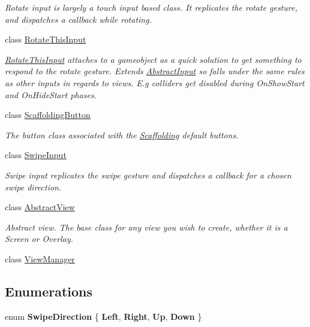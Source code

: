 \begin{DoxyCompactItemize}
\begin{DoxyCompactList}\small\item\em Rotate input is largely a touch input based class. It replicates the rotate gesture, and dispatches a callback while rotating. \end{DoxyCompactList}\item 
class \hyperlink{class_scaffolding_1_1_rotate_this_input}{Rotate\-This\-Input}
\begin{DoxyCompactList}\small\item\em \hyperlink{class_scaffolding_1_1_rotate_this_input}{Rotate\-This\-Input} attaches to a gameobject as a quick solution to get something to respond to the rotate gesture. Extends \hyperlink{class_scaffolding_1_1_abstract_input}{Abstract\-Input} so falls under the same rules as other inputs in regards to views. E.\-g colliders get disabled during On\-Show\-Start and On\-Hide\-Start phases. \end{DoxyCompactList}\item 
class \hyperlink{class_scaffolding_1_1_scaffolding_button}{Scaffolding\-Button}
\begin{DoxyCompactList}\small\item\em The button class associated with the \hyperlink{namespace_scaffolding}{Scaffolding} default buttons. \end{DoxyCompactList}\item 
class \hyperlink{class_scaffolding_1_1_swipe_input}{Swipe\-Input}
\begin{DoxyCompactList}\small\item\em Swipe input replicates the swipe gesture and dispatches a callback for a chosen swipe direction. \end{DoxyCompactList}\item 
class \hyperlink{class_scaffolding_1_1_abstract_view}{Abstract\-View}
\begin{DoxyCompactList}\small\item\em Abstract view. The base class for any view you wish to create, whether it is a Screen or Overlay. \end{DoxyCompactList}\item 
class \hyperlink{class_scaffolding_1_1_view_manager}{View\-Manager}
\end{DoxyCompactItemize}
\subsection*{Enumerations}
\begin{DoxyCompactItemize}
\item 
enum {\bfseries Swipe\-Direction} \{ {\bfseries Left}, 
{\bfseries Right}, 
{\bfseries Up}, 
{\bfseries Down}
 \}
\end{DoxyCompactItemize}
